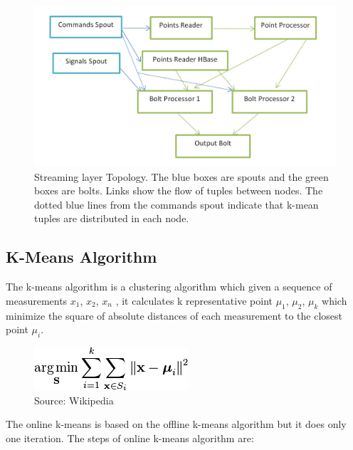 \documentclass{lmproj}
\begin{document}
\begin{figure}[H]
	\centering	
	\includegraphics[scale=0.5]{topology}
	\caption{Streaming layer Topology. The blue boxes are spouts and the green boxes are bolts. Links show the flow of tuples between nodes. The dotted blue lines from the commands spout indicate that k-mean tuples are distributed in each node.}
\end{figure}


\subsection{K-Means Algorithm}

The k-means algorithm is a clustering algorithm which given a sequence of measurements $x_{1}$, $x_{2}$, $x_{n}$ , it calculates k representative point $\mu_{1}$, $\mu_{2}$, $\mu_{k}$ which minimize the square of absolute distances of each measurement to the closest point $\mu_{i}$.

\begin{figure}[hp]
	\centering	
	\includegraphics[scale=1.5]{kmeans}
	\caption{Source: Wikipedia}
\end{figure}

The online k-means is based on the offline k-means algorithm but it does only one iteration. The steps of online k-means algorithm are:
\end{document}
